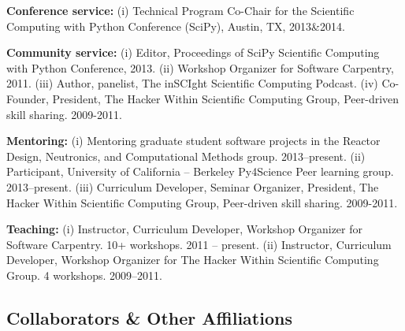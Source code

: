 \documentclass[svgnames,11pt]{article}
\begin{document}
\begin{bibenum}[itemsep=4pt]

    \item \textbf{Conference service:}
        (i) Technical Program Co-Chair for the Scientific Computing with Python 
        Conference (SciPy), Austin, TX, 2013\&2014.

    \item \textbf{Community service:}
        (i) Editor, Proceedings of SciPy Scientific Computing with Python 
        Conference, 2013.
        (ii) Workshop Organizer for Software Carpentry, 2011.
        (iii) Author, panelist, The inSCIght Scientific Computing Podcast.
        (iv) Co-Founder, President, The Hacker Within Scientific Computing Group, 
        Peer-driven skill sharing. 2009-2011.

    \item \textbf{Mentoring:}
        (i) Mentoring graduate student software projects in the Reactor Design, 
        Neutronics, and Computational Methods group. 2013--present.  
        (ii) Participant, University of California -- Berkeley Py4Science Peer 
        learning group. 2013--present. 
        (iii) Curriculum Developer, Seminar Organizer, President, The Hacker 
        Within Scientific Computing Group, Peer-driven skill sharing. 2009-2011.

    \item \textbf{Teaching:}
        (i) Instructor, Curriculum Developer, Workshop Organizer for 
        Software Carpentry. 10+ workshops. 2011 -- present.
        (ii) Instructor, Curriculum Developer, Workshop Organizer for 
        The Hacker Within Scientific Computing Group. 4 workshops. 2009--2011.


\end{bibenum}

\subsection{Collaborators \& Other Affiliations}
\end{document}
